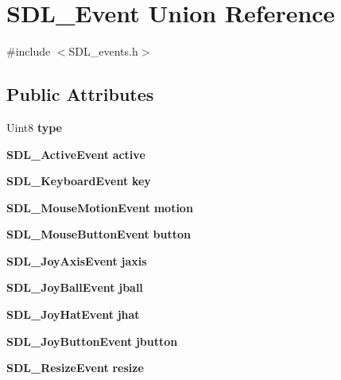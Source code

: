 \section{S\+D\+L\+\_\+\+Event Union Reference}
\label{union_s_d_l___event}


{\ttfamily \#include $<$S\+D\+L\+\_\+events.\+h$>$}

\subsection*{Public Attributes}
\begin{DoxyCompactItemize}
\item 
Uint8 {\bfseries type}\label{union_s_d_l___event_a166d8d0350220f28bef35a7b4a8c6900}

\item 
{\bf S\+D\+L\+\_\+\+Active\+Event} {\bfseries active}\label{union_s_d_l___event_ab8b2b899275fb4116ec85ae5a926b23d}

\item 
{\bf S\+D\+L\+\_\+\+Keyboard\+Event} {\bfseries key}\label{union_s_d_l___event_ab99927835cc77a9b6bb50b419b4a27df}

\item 
{\bf S\+D\+L\+\_\+\+Mouse\+Motion\+Event} {\bfseries motion}\label{union_s_d_l___event_ac3c89e190faacbe84280cd539453bab6}

\item 
{\bf S\+D\+L\+\_\+\+Mouse\+Button\+Event} {\bfseries button}\label{union_s_d_l___event_ab6da2fa2687e5f849f270adecc64785f}

\item 
{\bf S\+D\+L\+\_\+\+Joy\+Axis\+Event} {\bfseries jaxis}\label{union_s_d_l___event_ac4611acd0e9c675e67dc20919f0accb4}

\item 
{\bf S\+D\+L\+\_\+\+Joy\+Ball\+Event} {\bfseries jball}\label{union_s_d_l___event_ae433f511e3383d17f8fe02df745ee8f8}

\item 
{\bf S\+D\+L\+\_\+\+Joy\+Hat\+Event} {\bfseries jhat}\label{union_s_d_l___event_a421b40e0f8e01f181c8d5548cff1dd1d}

\item 
{\bf S\+D\+L\+\_\+\+Joy\+Button\+Event} {\bfseries jbutton}\label{union_s_d_l___event_a591104d64903ae1cf70874fb5d3124ff}

\item 
{\bf S\+D\+L\+\_\+\+Resize\+Event} {\bfseries resize}\label{union_s_d_l___event_a6e82d8628b9402aaa7660ebf0162228a}


\end{DoxyCompactItemize}
